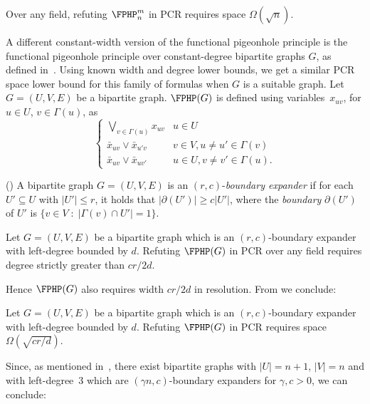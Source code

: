 \documentclass{toc}
\begin{document}
\begin{corollary} \label{cor:FPHP_space}
Over any field, refuting $\FPHP^m_n$ in PCR requires space $\Omega(\sqrt{n})$.
\end{corollary}

A different constant-width version of the functional pigeonhole principle is the functional pigeonhole principle over 
constant-degree bipartite graphs $G$, as defined in~\cite{DBLP:conf/coco/MiksaN15}. Using known width and degree lower bounds, we  get a similar PCR space lower bound for this family of formulas when $G$ is a suitable graph. 
Let $G=(U,V,E)$ be a bipartite graph. $\FPHP(G)$ is defined using variables~$x_{uv}$,  for $u\in U$, $v \in \Gamma(u)$,
as 
 $$
\left \{
\begin{array}{ll}
\bigvee_{v\in\Gamma(u)}x_{uv}  & u \in U   \\
\bar x_{uv} \vee \bar x_{u'v}  & v\in V,u \not = u' \in \Gamma(v) \\
\bar x_{uv} \vee \bar x_{uv'}&  u \in U,  v \not = v'\in \Gamma(u).
\end{array}
\right.
$$

%
%
\begin{definition} (\cite[Definition 3.1]{DBLP:conf/coco/MiksaN15}) 
%
A bipartite graph $G=(U,V,E)$ is an $(r,c)$-\emph{boundary expander} if for each 
$U'\subseteq U$ with $|U'|\leq r$, it holds that $|\partial(U')| \geq c |U'|$,
where the \emph{boundary} $\partial(U')$ of $U'$ is $\{v \in V \; : \; |\Gamma(v) \cap U'|=1\}$.
\end{definition}

%
%
%
%
\begin{theorem}
%
Let $G=(U,V,E)$  be a bipartite graph which is an $(r,c)$-boundary expander
with left-degree bounded by $d$. 
Refuting $\FPHP(G)$ in PCR over any field requires degree strictly
greater than $cr /2d$.
\end{theorem}

Hence $\FPHP(G)$ also requires width  $cr/2d$ in resolution. From   
we conclude:

\begin{theorem}
Let $G=(U,V,E)$ be a bipartite graph which is an $(r,c)$-boundary expander
with left-degree bounded by $d$.   
Refuting $\FPHP(G)$ in PCR requires space $\Omega(\sqrt{{c r}/{d}})$.
\end{theorem}

Since, as mentioned in~\cite{DBLP:conf/coco/MiksaN15}, 
there exist bipartite graphs with $|U| = n+1$, $|V| = n$ and with left-degree~3 
which are $(\gamma n, c)$-boundary expanders for $\gamma, c > 0$, we can conclude:
\end{document}
